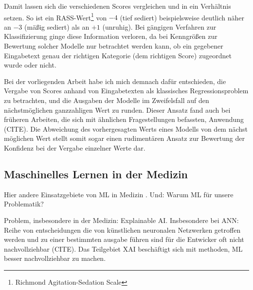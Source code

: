 Damit lassen sich die verschiedenen Scores vergleichen und in ein Verhältnis setzen. So ist ein RASS-Wert\footnote{Richmond Agitation-Sedation Scale} von $-4$ (tief sediert) beispielsweise deutlich näher an $-3$ (mäßig sediert) als an $+1$ (unruhig). Bei gängigen Verfahren zur Klassifizierung ginge diese Information verloren, da bei Kenngrößen zur Bewertung solcher Modelle nur betrachtet werden kann, ob ein gegebener Eingabetext genau der richtigen Kategorie (dem richtigen Score) zugeordnet wurde oder nicht. 

Bei der vorliegenden Arbeit habe ich mich demnach dafür entschieden, die Vergabe von Scores anhand von Eingabetexten als klassisches Regressionsproblem zu betrachten, und die Ausgaben der Modelle im Zweifelsfall auf den nächstmöglichen ganzzahligen Wert zu runden. Dieser Ansatz fand auch bei früheren Arbeiten, die sich mit ähnlichen Fragestellungen befassten, Anwendung (CITE). Die Abweichung des vorhergesagten Werts eines Modells von dem nächst möglichen Wert stellt somit sogar einen rudimentären Ansatz zur Bewertung der Konfidenz bei der Vergabe einzelner Werte dar. %

\subsection{Maschinelles Lernen in der Medizin}
Hier andere Einsatzgebiete von ML in Medizin \citep{krishnanSupervisedLearningApproach2018}. Und: Warum ML für unsere Problematik?

Problem, insbesondere in der Medizin: Explainable AI. Insbesondere bei ANN: Reihe von entscheidungen die von künstlichen neuronalen Netzwerken getroffen werden und zu einer bestimmten ausgabe führen sind für die Entwicker oft nicht nachvollziehbar (CITE). Das Teilgebiet XAI beschäftigt sich mit methoden, ML besser nachvollziehbar zu machen.